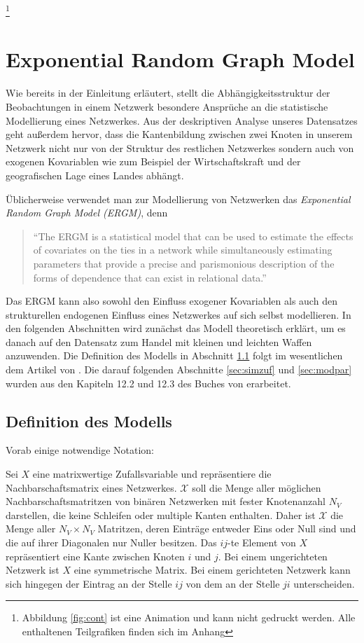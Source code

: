 \documentclass[a4paper,ngerman,oneside,titlepage,bibliography=totoc,11pt]{scrreprt}
\begin{document}
\footnote{Abbildung \ref{fig:cont} ist eine Animation und kann nicht gedruckt werden. Alle enthaltenen Teilgrafiken finden sich im Anhang}
\chapter{Exponential Random Graph Model}
 Wie bereits in der Einleitung erläutert, stellt die Abhängigkeitsstruktur der Beobachtungen in einem Netzwerk besondere Ansprüche an die statistische Modellierung eines Netzwerkes. Aus der deskriptiven Analyse unseres Datensatzes geht außerdem hervor, dass die Kantenbildung zwischen zwei Knoten in unserem Netzwerk nicht nur von der Struktur des restlichen Netzwerkes sondern auch von exogenen Kovariablen wie zum Beispiel der Wirtschaftskraft und der geografischen Lage eines Landes abhängt.

Üblicherweise verwendet man zur Modellierung von Netzwerken das \emph{Exponential Random Graph Model (ERGM)}, denn
\begin{quote}
"`The ERGM is a statistical model that can be used to estimate the effects of covariates on the ties in a network while simultaneously estimating parameters that provide a precise and parismonious description of the forms of dependence that can exist in relational data."' \citep{cranmer2011inferential}
\end{quote}
Das ERGM kann also sowohl den Einfluss exogener Kovariablen als auch den strukturellen endogenen Einfluss eines Netzwerkes auf sich selbst modellieren. In den folgenden Abschnitten wird zunächst das Modell theoretisch erklärt, um es danach auf den Datensatz zum Handel mit kleinen und leichten Waffen anzuwenden. Die Definition des Modells in Abschnitt \ref{sec:defmod} folgt im wesentlichen dem Artikel von \citet{hunter2008ergm}. Die darauf folgenden Abschnitte \ref{sec:simzuf} und \ref{sec:modpar} wurden aus den Kapiteln 12.2 und 12.3 des Buches von \citet{lkr12} erarbeitet.

\section{Definition des Modells}
\label{sec:defmod}
Vorab einige notwendige Notation:

Sei $X$ eine matrixwertige Zufallsvariable und repräsentiere die Nachbarschaftsmatrix eines Netzwerkes. $\mathcal{X}$ soll die Menge aller möglichen Nachbarschaftsmatritzen von binären Netzwerken mit fester Knotenanzahl $N_V$ darstellen, die keine Schleifen oder multiple Kanten enthalten. Daher ist $\mathcal{X}$ die Menge aller $N_V \times N_V$ Matritzen, deren Einträge entweder Eins oder Null sind und die auf ihrer Diagonalen nur Nuller besitzen. Das $ij$-te Element von $X$ repräsentiert eine Kante zwischen Knoten $i$ und $j$. Bei einem ungerichteten Netzwerk ist $X$ eine symmetrische Matrix. Bei einem gerichteten Netzwerk kann sich hingegen der Eintrag an der Stelle $ij$ von dem an der Stelle $ji$ unterscheiden.
\end{document}
